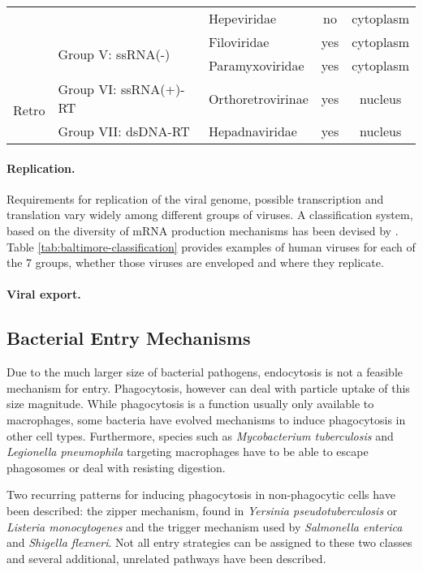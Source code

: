 \begin{table}
\begin{tabular}{c|l|l|c|c}
    \cline{3-5} &
    & Hepeviridae &
    no & cytoplasm \\
    \cline{2-5} &
    \multirow{2}{*}{Group V: ssRNA(-)} &
    Filoviridae &
    yes & cytoplasm \\
    \cline{3-5} &
    & Paramyxoviridae &
    yes & cytoplasm \\
    \hline \multirow{2}{*}{\begin{sideways}Retro\end{sideways}} &   
    Group VI: ssRNA(+)-RT &
    Orthoretrovirinae &
    yes & nucleus \\
    \cline{2-5} &
    Group VII: dsDNA-RT &
    Hepadnaviridae &
    yes & nucleus
  \end{tabular}
\end{table}

\paragraph{Replication.}
Requirements for replication of the viral genome, possible transcription and translation vary widely among different groups of viruses. A classification system, based on the diversity of mRNA production mechanisms has been devised by \cite{Baltimore1971}. Table \ref{tab:baltimore-classification} provides examples of human viruses for each of the 7 groups, whether those viruses are enveloped and where they replicate.

\paragraph{Viral export.}

\subsection{Bacterial Entry Mechanisms}

Due to the much larger size of bacterial pathogens, endocytosis is not a feasible mechanism for entry. Phagocytosis, however can deal with particle uptake of this size magnitude. While phagocytosis is a function usually only available to macrophages, some bacteria have evolved mechanisms to induce phagocytosis in other cell types. Furthermore, species such as \textit{Mycobacterium tuberculosis} and \textit{Legionella pneumophila} targeting macrophages have to be able to escape phagosomes or deal with resisting digestion.

Two recurring patterns for inducing phagocytosis in non-phagocytic cells have been described: the zipper mechanism, found in \textit{Yersinia pseudotuberculosis} or \textit{Listeria monocytogenes} and the trigger mechanism used by \textit{Salmonella enterica} and \textit{Shigella flexneri}. Not all entry strategies can be assigned to these two classes and several additional, unrelated pathways have been described.

